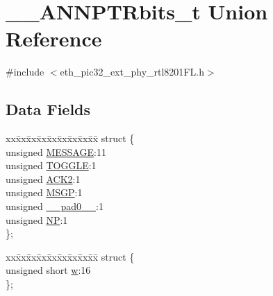 \hypertarget{union_____a_n_n_p_t_rbits__t}{}\section{\+\_\+\+\_\+\+A\+N\+N\+P\+T\+Rbits\+\_\+t Union Reference}
\label{union_____a_n_n_p_t_rbits__t}


{\ttfamily \#include $<$eth\+\_\+pic32\+\_\+ext\+\_\+phy\+\_\+rtl8201\+F\+L.\+h$>$}

\subsection*{Data Fields}
\begin{DoxyCompactItemize}
\item 
\begin{tabbing}
xx\=xx\=xx\=xx\=xx\=xx\=xx\=xx\=xx\=\kill
struct \{\\
\>unsigned \hyperlink{union_____a_n_n_p_t_rbits__t_a06361005f0d2faefe34e0bdb1499bfe7}{MESSAGE}:11\\
\>unsigned \hyperlink{union_____a_n_n_p_t_rbits__t_ab4110904eded0b4b6a2280a6b4b9f4c2}{TOGGLE}:1\\
\>unsigned \hyperlink{union_____a_n_n_p_t_rbits__t_a04eefaff71d440a3996c7db3676475ba}{ACK2}:1\\
\>unsigned \hyperlink{union_____a_n_n_p_t_rbits__t_a8c958300dd9e82d064f59696a78d8e45}{MSGP}:1\\
\>unsigned \hyperlink{union_____a_n_n_p_t_rbits__t_adf71f3d8410c1f1dbbc96680a92c49af}{\_\_pad0\_\_}:1\\
\>unsigned \hyperlink{union_____a_n_n_p_t_rbits__t_ac89729be1dc289730931f8238a316516}{NP}:1\\
\}; \\

\end{tabbing}\item 
\begin{tabbing}
xx\=xx\=xx\=xx\=xx\=xx\=xx\=xx\=xx\=\kill
struct \{\\
\>unsigned short \hyperlink{union_____a_n_n_p_t_rbits__t_a160850a4684a3e82c2323033964f2e98}{w}:16\\
\}; \\


\end{tabbing}
\end{DoxyCompactItemize}
